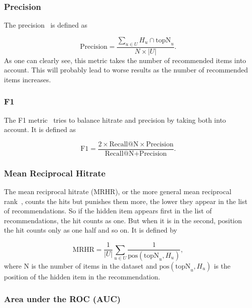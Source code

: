 \subsubsection{Precision}

The precision~\cite{Sarwar00applicationof} is defined as

\begin{equation} 
\text{Precision}=\frac{\sum_{u \in U} H_u \cap \text{topN}_u}{N \times |U|}.
\end{equation}
As one can clearly see, this metric takes the number of recommended
items into account. This will probably lead to worse results as the
number of recommended items increases.


\subsubsection{F1}

The F1 metric~\cite{Sarwar00applicationof} tries to balance hitrate and precision
by taking both into account. It is defined as

\begin{equation}
\text{F1}=\frac{2 \times \text{Recall@N} \times \text{Precision}}{\text{Recall@N} + \text{Precision}}.
\end{equation}


\subsubsection{Mean Reciprocal Hitrate}

The mean reciprocal hitrate (MRHR), or the more general mean reciprocal
rank~\cite{DBLP:conf/icdm/NingK11}, counts the hits but punishes them more, the lower they
appear in the list of recommendations. So if the hidden item appears
first in the list of recommendations, the hit counts as one. But when
it is in the second, position the hit counts only as one half
and so on. It is defined by

\begin{equation}
\text{MRHR}=\frac{1}{|U|} \sum_{u \in U} \frac{1}{\text{pos}(\text{topN}_{u},H_{u})},
\end{equation}
where N is the number of items in the dataset and \(\text{pos}(\text{topN}_{u},H_{u})\)
is the position of the hidden item in the recommendation.


\subsubsection{Area under the ROC (AUC)}


